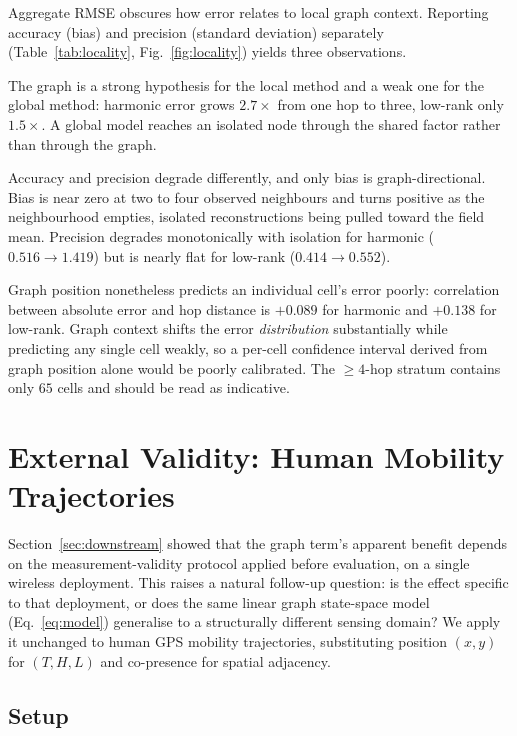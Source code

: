 \documentclass[conference]{IEEEtran}
\begin{document}
Aggregate RMSE obscures how error relates to local graph context. Reporting
accuracy (bias) and precision (standard deviation) separately
(Table~\ref{tab:locality}, Fig.~\ref{fig:locality}) yields three observations.

The graph is a strong hypothesis for the local method and a weak one for the
global method: harmonic error grows $2.7\times$ from one hop to three, low-rank
only $1.5\times$. A global model reaches an isolated node through the shared
factor rather than through the graph.

Accuracy and precision degrade differently, and only bias is
graph-directional. Bias is near zero at two to four observed neighbours and
turns positive as the neighbourhood empties, isolated reconstructions being
pulled toward the field mean. Precision degrades monotonically with isolation
for harmonic ($0.516 \to 1.419$) but is nearly flat for low-rank
($0.414 \to 0.552$).

Graph position nonetheless predicts an individual cell's error poorly:
correlation between absolute error and hop distance is $+0.089$ for harmonic
and $+0.138$ for low-rank. Graph context shifts the error \emph{distribution}
substantially while predicting any single cell weakly, so a per-cell confidence
interval derived from graph position alone would be poorly calibrated. The
$\geq\!4$-hop stratum contains only $65$ cells and should be read as
indicative.

\section{External Validity: Human Mobility Trajectories}
\label{sec:external}

Section~\ref{sec:downstream} showed that the graph term's apparent benefit
depends on the measurement-validity protocol applied before evaluation, on a
single wireless deployment. This raises a natural follow-up question: is the
effect specific to that deployment, or does the same linear graph state-space
model (Eq.~\ref{eq:model}) generalise to a structurally different sensing
domain? We apply it unchanged to human GPS mobility trajectories, substituting
position $(x,y)$ for $(T,H,L)$ and co-presence for spatial adjacency.

\subsection{Setup}
\end{document}
